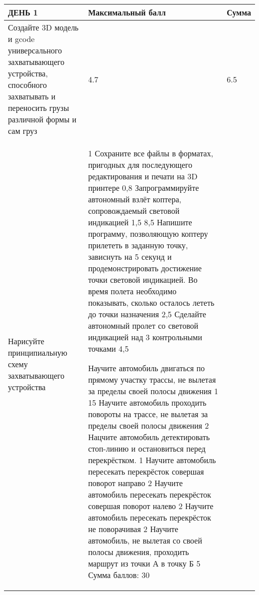 \begin{table}
    \begin{center}
        \begin{tabular}{|p{6.5cm}|p{2.5cm}|p{1.5cm}|}
            \hline
            ДЕНЬ 1 & Максимальный балл & Сумма \\
            \hline
            Создайте 3D модель и gcode универсального захватывающего устройства, способного захватывать и переносить грузы различной формы и сам груз & 4.7 & 6.5 \\
            \hline
            Нарисуйте принципиальную схему захватывающего устройства & 1
            Сохраните все файлы в форматах, пригодных для последующего редактирования и печати на 3D принтере
            0,8
            Запрограммируйте автономный взлёт коптера, сопровождаемый световой индикацией
            1,5
            8,5
            Напишите программу, позволяющую коптеру прилететь в заданную точку, зависнуть на 5 секунд и продемонстрировать достижение точки световой индикацией. Во время полета необходимо показывать, сколько осталось лететь до точки назначения 
            2,5
            Сделайте автономный пролет со световой индикацией над 3 контрольными точками
            4,5




            Научите автомобиль двигаться по прямому участку трассы, не вылетая за пределы своей полосы движения
            1
            15
            Научите автомобиль проходить повороты на трассе, не вылетая за пределы своей полосы движения
            2
            Нацчите автомобиль детектировать стоп-линию и остановиться перед перекрёстком.
            1
            Научите автомобиль пересекать перекрёсток совершая поворот направо
            2
            Научите автомобиль пересекать перекрёсток совершая поворот налево
            2
            Научите автомобиль пересекать перекрёсток не поворачивая
            2
            Научите автомобиль, не вылетая со своей полосы движения, проходить маршрут из точки А в точку Б
            5
            Сумма баллов:
            30
 

        \end{tabular}
    \end{center}
\end{table}

\begin{table}
    \begin{center}
        \begin{tabular}{|p{6.5cm}|p{2.5cm}|p{1.5cm}|}

        \end{tabular}
    \end{center}
\end{table}

\begin{table}
    \begin{center}
        \begin{tabular}{|p{6.5cm}|p{2.5cm}|p{1.5cm}|}

        \end{tabular}
    \end{center}
\end{table}